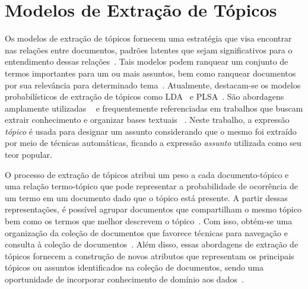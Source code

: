 
\section{Modelos de Extração de Tópicos}





Os modelos de extração de tópicos fornecem uma estratégia que visa encontrar nas relações entre documentos, padrões latentes que sejam significativos para o entendimento dessas relações~\cite{Wei2007}. Tais modelos podem ranquear um conjunto de termos importantes para um ou mais assuntos, bem como ranquear documentos por sua relevância para determinado tema~\cite{Faleiros2016,Xing2009}.
Atualmente, destacam-se os modelos probabilísticos de extração de tópicos como LDA~\cite{Blei2003} e PLSA~\cite{Hofmann1999}. São abordagens amplamente utilizadas ~\cite{DZhu20122} e frequentemente referenciadas em trabalhos que buscam extrair conhecimento e organizar bases textuais ~\cite{Aggarwal2018, OCallaghan2015, Steyvers2007}.  
%
%
Neste trabalho, a expressão \textit{tópico} é usada para designar um assunto considerando que o mesmo foi extraído por meio de técnicas automáticas, ficando a expressão \textit{assunto} utilizada como seu teor popular. 

O processo de extração de tópicos atribui um peso a cada documento-tópico e uma relação termo-tópico que pode representar a probabilidade de ocorrência de um termo em um documento dado que o tópico está presente. A partir dessas representações, é possível agrupar documentos que compartilham o mesmo tópico bem como os termos que melhor descrevem o tópico~\cite{Aggarwal2018}. Com isso, obtém-se uma organização da coleção de documentos que favorece técnicas para navegação e consulta à coleção de documentos~\cite{Maracini2010}. 
% 
Além disso, essas abordagens de extração de tópicos fornecem a construção de novos atributos que representam os principais tópicos ou assuntos identificados na coleção de documentos, sendo uma oportunidade de incorporar conhecimento de domínio aos dados~\cite{Guyon2003}. 


